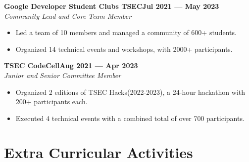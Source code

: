 \documentclass[a4,10pt]{article}
\newenvironment{zitemize}{
\begin{itemize}\itemsep0pt \parskip0pt \parsep1pt}
{\end{itemize}\vspace{-0.5cm}}
\begin{document}
\vspace{-0.1cm}
\textbf{Google Developer Student Clubs TSEC}\textbf{\hfill Jul 2021 --- May 2023}\\
    \emph{Community Lead and Core Team Member}
    \begin{zitemize}
    \vspace{-0.25cm}
            \item Led a team of 10 members and managed a community of 600+ students.
            \item Organized 14 technical events and workshops, with 2000+ participants.
    \end{zitemize}
    \vspace{-0.05cm}
    
\vspace{0.4cm}
\textbf{TSEC CodeCell}\textbf{\hfill Aug 2021 --- Apr 2023}\\
    \emph{Junior and Senior Committee Member}
    \begin{zitemize}
    \vspace{-0.25cm}
            \item Organized 2 editions of TSEC Hacks(2022-2023), a 24-hour hackathon with 200+ participants each.
            \item Executed 4 technical events with a combined total of over 700 participants.
    \end{zitemize}
\vspace{-0.2cm}






\section{Extra Curricular Activities}
\vspace{-0.1cm}
\end{document}
